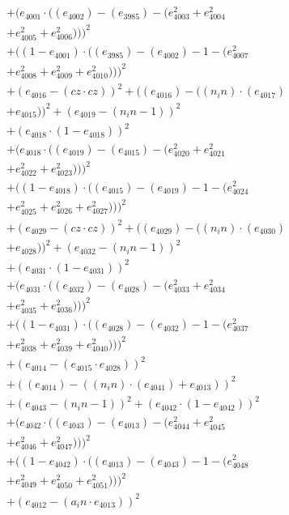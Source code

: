 \documentclass[10pt, a4paper]{article}
\begin{document}
\begin{small}
\begin{align*}
& + (e_{4001}  \cdot  ((e_{4002}) - (e_{3985}) - (e_{4003}^{2} + e_{4004}^{2} \\
& + e_{4005}^{2} + e_{4006}^{2})))^{2} \\
& + ((1 - e_{4001})  \cdot  ((e_{3985}) - (e_{4002}) - 1 - (e_{4007}^{2} \\
& + e_{4008}^{2} + e_{4009}^{2} + e_{4010}^{2})))^{2} \\
& + (e_{4016} - (cz  \cdot  cz))^{2} + ((e_{4016}) - ((n_in)  \cdot  (e_{4017}) \\
& + e_{4015}))^{2} + (e_{4019} - (n_in - 1))^{2} \\
& + (e_{4018}  \cdot  (1 - e_{4018}))^{2} \\
& + (e_{4018}  \cdot  ((e_{4019}) - (e_{4015}) - (e_{4020}^{2} + e_{4021}^{2} \\
& + e_{4022}^{2} + e_{4023}^{2})))^{2} \\
& + ((1 - e_{4018})  \cdot  ((e_{4015}) - (e_{4019}) - 1 - (e_{4024}^{2} \\
& + e_{4025}^{2} + e_{4026}^{2} + e_{4027}^{2})))^{2} \\
& + (e_{4029} - (cz  \cdot  cz))^{2} + ((e_{4029}) - ((n_in)  \cdot  (e_{4030}) \\
& + e_{4028}))^{2} + (e_{4032} - (n_in - 1))^{2} \\
& + (e_{4031}  \cdot  (1 - e_{4031}))^{2} \\
& + (e_{4031}  \cdot  ((e_{4032}) - (e_{4028}) - (e_{4033}^{2} + e_{4034}^{2} \\
& + e_{4035}^{2} + e_{4036}^{2})))^{2} \\
& + ((1 - e_{4031})  \cdot  ((e_{4028}) - (e_{4032}) - 1 - (e_{4037}^{2} \\
& + e_{4038}^{2} + e_{4039}^{2} + e_{4040}^{2})))^{2} \\
& + (e_{4014} - (e_{4015}  \cdot  e_{4028}))^{2} \\
& + ((e_{4014}) - ((n_in)  \cdot  (e_{4041}) + e_{4013}))^{2} \\
& + (e_{4043} - (n_in - 1))^{2} + (e_{4042}  \cdot  (1 - e_{4042}))^{2} \\
& + (e_{4042}  \cdot  ((e_{4043}) - (e_{4013}) - (e_{4044}^{2} + e_{4045}^{2} \\
& + e_{4046}^{2} + e_{4047}^{2})))^{2} \\
& + ((1 - e_{4042})  \cdot  ((e_{4013}) - (e_{4043}) - 1 - (e_{4048}^{2} \\
& + e_{4049}^{2} + e_{4050}^{2} + e_{4051}^{2})))^{2} \\
& + (e_{4012} - (a_in  \cdot  e_{4013}))^{2} \\

\end{align*}
\end{small}
\end{document}
